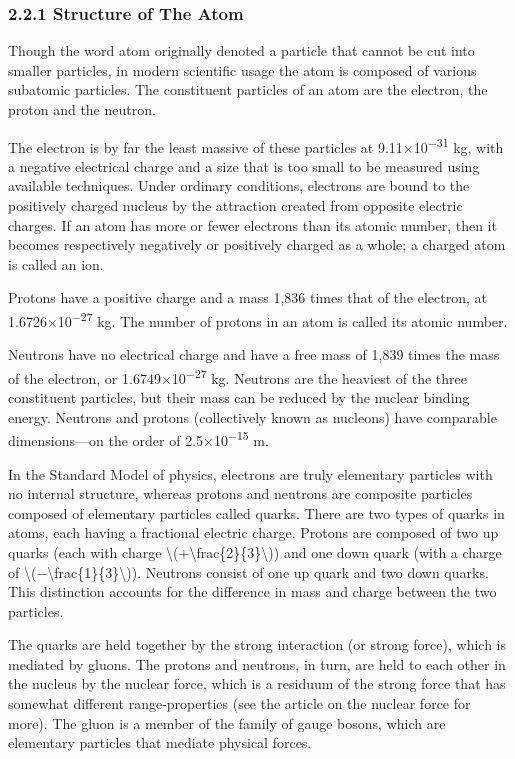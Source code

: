 \documentclass[
]{article}
\theoremstyle{definition}
\theoremstyle{definition}
\theoremstyle{definition}
\theoremstyle{remark}
\begin{document}
\hypertarget{structure-of-the-atom}{%
\subsubsection{\texorpdfstring{{2.2.1} Structure of The
Atom}{2.2.1 Structure of The Atom}}\label{structure-of-the-atom}}

Though the word atom originally denoted a particle that cannot be cut
into smaller particles, in modern scientific usage the atom is composed
of various subatomic particles. The constituent particles of an atom are
the electron, the proton and the neutron.

The electron is by far the least massive of these particles at
9.11×10\textsuperscript{−31} kg, with a negative electrical charge and a
size that is too small to be measured using available techniques. Under
ordinary conditions, electrons are bound to the positively charged
nucleus by the attraction created from opposite electric charges. If an
atom has more or fewer electrons than its atomic number, then it becomes
respectively negatively or positively charged as a whole; a charged atom
is called an ion.

Protons have a positive charge and a mass 1,836 times that of the
electron, at 1.6726×10\textsuperscript{−27} kg. The number of protons in
an atom is called its atomic number.

Neutrons have no electrical charge and have a free mass of 1,839 times
the mass of the electron, or 1.6749×10\textsuperscript{−27} kg. Neutrons
are the heaviest of the three constituent particles, but their mass can
be reduced by the nuclear binding energy. Neutrons and protons
(collectively known as nucleons) have comparable dimensions---on the
order of 2.5×10\textsuperscript{−15} m.

In the Standard Model of physics, electrons are truly elementary
particles with no internal structure, whereas protons and neutrons are
composite particles composed of elementary particles called quarks.
There are two types of quarks in atoms, each having a fractional
electric charge. Protons are composed of two up quarks (each with charge
{\textbackslash(+\textbackslash frac\{2\}\{3\}\textbackslash)}) and one
down quark (with a charge of
{\textbackslash(−\textbackslash frac\{1\}\{3\}\textbackslash)}).
Neutrons consist of one up quark and two down quarks. This distinction
accounts for the difference in mass and charge between the two
particles.

The quarks are held together by the strong interaction (or strong
force), which is mediated by gluons. The protons and neutrons, in turn,
are held to each other in the nucleus by the nuclear force, which is a
residuum of the strong force that has somewhat different
range-properties (see the article on the nuclear force for more). The
gluon is a member of the family of gauge bosons, which are elementary
particles that mediate physical forces.
\end{document}
